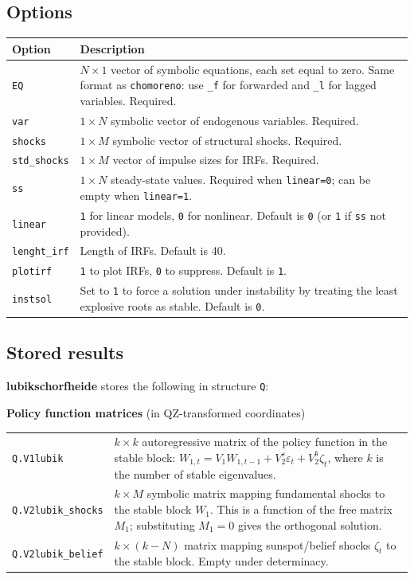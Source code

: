 \documentclass{article}
\begin{document}
\subsection{Options}

\begin{longtable}[c]{p{2.8cm}p{11.2cm}}
\toprule
\textbf{Option} & \textbf{Description} \\
\midrule
\texttt{EQ} & $N \times 1$ vector of symbolic equations, each set equal to zero. Same format as \texttt{chomoreno}: use \texttt{\_f} for forwarded and \texttt{\_l} for lagged variables. Required. \\[0.3em]
\texttt{var} & $1 \times N$ symbolic vector of endogenous variables. Required. \\[0.3em]
\texttt{shocks} & $1 \times M$ symbolic vector of structural shocks. Required. \\[0.3em]
\texttt{std\_shocks} & $1 \times M$ vector of impulse sizes for IRFs. Required. \\[0.3em]
\texttt{ss} & $1 \times N$ steady-state values. Required when \texttt{linear=0}; can be empty when \texttt{linear=1}. \\[0.3em]
\texttt{linear} & \texttt{1} for linear models, \texttt{0} for nonlinear. Default is \texttt{0} (or \texttt{1} if \texttt{ss} not provided). \\[0.3em]
\texttt{lenght\_irf} & Length of IRFs. Default is 40. \\[0.3em]
\texttt{plotirf} & \texttt{1} to plot IRFs, \texttt{0} to suppress. Default is \texttt{1}. \\[0.3em]
\texttt{instsol} & Set to \texttt{1} to force a solution under instability by treating the least explosive roots as stable. Default is \texttt{0}. \\[0.3em]
\bottomrule
\end{longtable}

\subsection{Stored results}

\textbf{lubikschorfheide} stores the following in structure \texttt{Q}:

\medskip
\noindent\textbf{Policy function matrices} (in QZ-transformed coordinates)

\vspace{0.5em}
\begin{tabular}{@{}p{5cm}p{9cm}@{}}
\texttt{Q.V1lubik} & $k \times k$ autoregressive matrix of the policy function in the stable block: $W_{1,t} = V_1 W_{1,t-1} + V_2^s \varepsilon_t + V_2^b \zeta_t$, where $k$ is the number of stable eigenvalues. \\[0.2em]
\texttt{Q.V2lubik\_shocks} & $k \times M$ symbolic matrix mapping fundamental shocks to the stable block $W_1$. This is a function of the free matrix $M_1$; substituting $M_1 = 0$ gives the orthogonal solution. \\[0.2em]
\texttt{Q.V2lubik\_belief} & $k \times (k-N)$ matrix mapping sunspot/belief shocks $\zeta_t$ to the stable block. Empty under determinacy. \\[0.2em]
\end{tabular}
\end{document}
